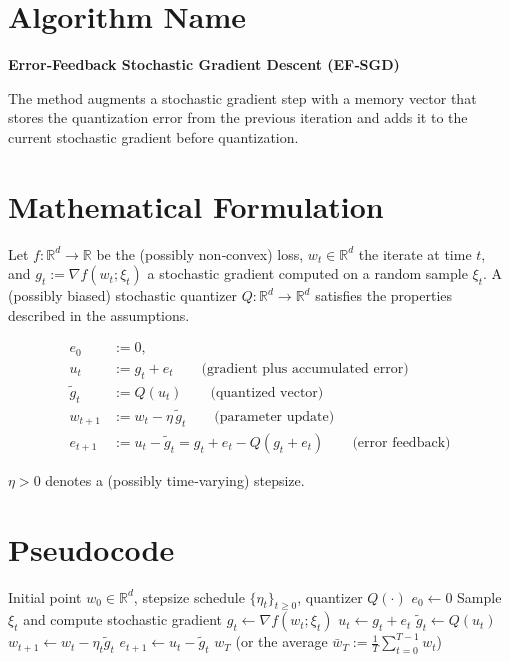 \documentclass{article}
\newcommand{\R}{\mathbb{R}}
\begin{document}
\section*{Algorithm Name}
\textbf{Error‑Feedback Stochastic Gradient Descent (EF‑SGD)}  

The method augments a stochastic gradient step with a memory vector that stores the quantization error from the previous iteration and adds it to the current stochastic gradient before quantization.

\section*{Mathematical Formulation}
Let $f:\R^{d}\rightarrow \R$ be the (possibly non‑convex) loss, $w_{t}\in\R^{d}$ the iterate at time $t$, and $g_{t}:=\nabla f(w_{t};\xi_{t})$ a stochastic gradient computed on a random sample $\xi_{t}$.  
A (possibly biased) stochastic quantizer $Q:\R^{d}\rightarrow\R^{d}$ satisfies the properties described in the assumptions.

\[
\boxed{
\begin{aligned}
e_{0}&:=0,\\
u_{t}&:=g_{t}+e_{t}\qquad\text{(gradient plus accumulated error)}\\
\tilde g_{t}&:=Q(u_{t})\qquad\text{(quantized vector)}\\
w_{t+1}&:=w_{t}-\eta\,\tilde g_{t}\qquad\text{(parameter update)}\\
e_{t+1}&:=u_{t}-\tilde g_{t}=g_{t}+e_{t}-Q(g_{t}+e_{t})\qquad\text{(error feedback)}
\end{aligned}}
\]

$\eta>0$ denotes a (possibly time‑varying) stepsize.

\section*{Pseudocode}
\begin{algorithm}[H]
\caption{EF‑SGD}
\begin{algorithmic}[1]
\Require Initial point $w_{0}\in\R^{d}$, stepsize schedule $\{\eta_{t}\}_{t\ge0}$, quantizer $Q(\cdot)$
\State $e_{0}\gets 0$
    \State Sample $\xi_{t}$ and compute stochastic gradient $g_{t}\gets \nabla f(w_{t};\xi_{t})$
    \State $u_{t}\gets g_{t}+e_{t}$
    \State $\tilde g_{t}\gets Q(u_{t})$
    \State $w_{t+1}\gets w_{t}-\eta_{t}\tilde g_{t}$
    \State $e_{t+1}\gets u_{t}-\tilde g_{t}$ 
\EndFor
\State \Return $w_{T}$ (or the average $\bar w_{T}:=\frac1T\sum_{t=0}^{T-1}w_{t}$)
\end{algorithmic}
\end{algorithm}
\end{document}

